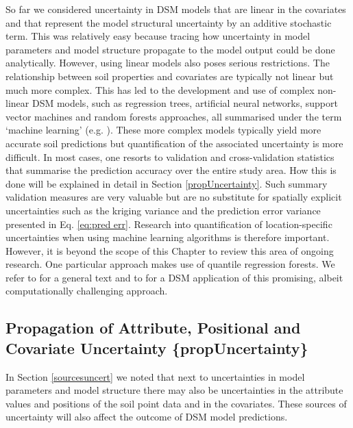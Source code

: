 \documentclass[10pt,b5paper,]{book}
\theoremstyle{definition}
\theoremstyle{definition}
\theoremstyle{definition}
\theoremstyle{remark}
\begin{document}
So far we considered uncertainty in DSM models that are linear in the
covariates and that represent the model structural uncertainty by an
additive stochastic term. This was relatively easy because tracing how
uncertainty in model parameters and model structure propagate to the
model output could be done analytically. However, using linear models
also poses serious restrictions. The relationship between soil
properties and covariates are typically not linear but much more
complex. This has led to the development and use of complex non-linear
DSM models, such as regression trees, artificial neural networks,
support vector machines and random forests approaches, all summarised
under the term `machine learning' (e.g. \cite{hengl2015mapping}). These
more complex models typically yield more accurate soil predictions but
quantification of the associated uncertainty is more difficult. In most
cases, one resorts to validation and cross-validation statistics that
summarise the prediction accuracy over the entire study area. How this
is done will be explained in detail in Section \ref{propUncertainty}.
Such summary validation measures are very valuable but are no substitute
for spatially explicit uncertainties such as the kriging variance and
the prediction error variance presented in Eq. \ref{eq:pred err}.
Research into quantification of location-specific uncertainties when
using machine learning algorithms is therefore important. However, it is
beyond the scope of this Chapter to review this area of ongoing
research. One particular approach makes use of quantile regression
forests. We refer to \cite{meinshausen2006quantile} for a general text
and to \cite{vaysse2017using} for a DSM application of this promising,
albeit computationally challenging approach.

\hypertarget{propagation-of-attribute-positional-and-covariate-uncertainty-propuncertainty}{%
\subsection{Propagation of Attribute, Positional and Covariate
Uncertainty
\{propUncertainty\}}\label{propagation-of-attribute-positional-and-covariate-uncertainty-propuncertainty}}

In Section \ref{sourcesuncert} we noted that next to uncertainties in
model parameters and model structure there may also be uncertainties in
the attribute values and positions of the soil point data and in the
covariates. These sources of uncertainty will also affect the outcome of
DSM model predictions.
\end{document}
